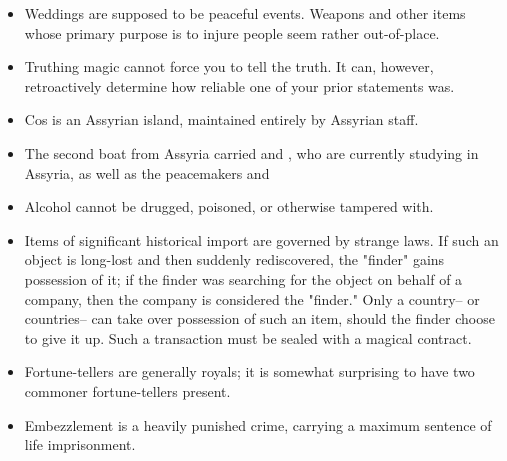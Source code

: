 \documentclass[blue]{Kos}
\begin{document}
\name{\bErrata{}}

\begin{itemize}
\item Weddings are supposed to be peaceful events. Weapons and other items whose primary purpose is to injure people seem rather out-of-place.
\item Truthing magic cannot force you to tell the truth. It can, however, retroactively determine how reliable one of your prior statements was.
\item Cos is an Assyrian island, maintained entirely by Assyrian staff.
\item The second boat from Assyria carried \cPoet{} and \cWard{}, who are currently studying in Assyria, as well as the peacemakers \cAnarchist{} and \cArchaeologist{}
\item Alcohol cannot be drugged, poisoned, or otherwise tampered with.
\item Items of significant historical import are governed by strange laws. If such an object is long-lost and then suddenly rediscovered, the "finder" gains possession of it; if the finder was searching for the object on behalf of a company, then the company is considered the "finder." Only a country-- or countries-- can take over possession of such an item, should the finder choose to give it up. Such a transaction must be sealed with a magical contract.
\item Fortune-tellers are generally royals; it is somewhat surprising to have two commoner fortune-tellers present.
\item Embezzlement is a heavily punished crime, carrying a maximum sentence of life imprisonment.
\end{itemize}
\end{document}
